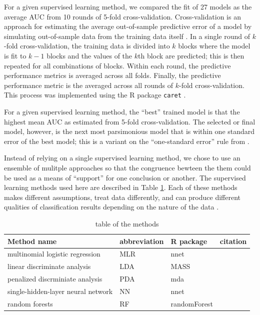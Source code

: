 \documentclass[12pt,letterpaper]{article}
\begin{document}
For a given supervised learning method, we compared the fit of 27 models as the average AUC from 10 rounds of 5-fold cross-validation. Cross-validation is an approach for estimating the average out-of-sample predictive error of a model by simulating out-of-sample data from the training data itself \citep{Hastie2009}. In a single round of \(k\)-fold cross-validation, the training data is divided into \(k\) blocks where the model is fit to \(k - 1\) blocks and the values of the \(k\)th block are predicted; this is then repeated for all combinations of blocks. Within each round, the predictive performance metrics is averaged across all folds. Finally, the predictive performance metric is the averaged across all rounds of \(k\)-fold cross-validation. This process was implemented using the R package \texttt{caret} \citep{KuhnMAN2013}.

For a given supervised learning method, the ``best'' trained model is that the highest mean AUC as estimated from 5-fold cross-validation. The selected or final model, however, is the next most parsimonious model that is within one standard error of the best model; this is a variant on the ``one-standard error'' rule from \citet{Hastie2009}.

Instead of relying on a single supervised learning method, we chose to use an ensemble of mulitple approaches so that the congruence bewteen the them could be used as a means of ``support'' for one conclusion or another. The supervised learning methods used here are described in Table \ref{tab:methods}. Each of these methods makes different assumptions, treat data differently, and can produce different qualities of classification results depending on the nature of the data \citep{Hastie2009}. 

\begin{table}
  \centering
  \begin{tabular}{l l l l}
    \hline
    Method name & abbreviation & R package & citation \\
    \hline
    multinomial logistic regression & MLR & nnet & \citet{Venables2002} \\
    linear discriminate analysis & LDA & MASS & \citet{Venables2002} \\
    penalized discrminiate analysis & PDA & mda & \citet{mdapack} \\
    single-hidden-layer neural network & NN & nnet & \citet{Venables2002} \\
    random forests & RF & randomForest & \citet{Liaw2002} \\
    \hline
  \end{tabular}
  \caption{table of the methods}
  \label{tab:methods}
\end{table}
\end{document}
